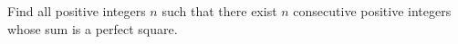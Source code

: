 Find all positive integers $n$ such that there exist $n$ consecutive positive integers whose sum is a perfect square.